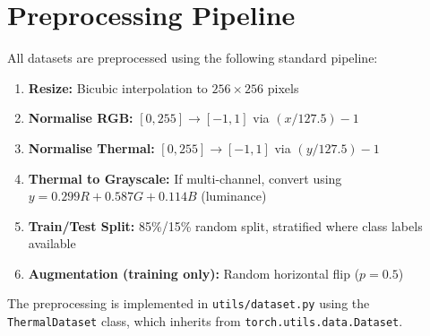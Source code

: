 \section{Preprocessing Pipeline}

All datasets are preprocessed using the following standard pipeline:

\begin{enumerate}
    \item \textbf{Resize:} Bicubic interpolation to $256 \times 256$ pixels
    \item \textbf{Normalise RGB:} $[0, 255] \to [-1, 1]$ via $(x/127.5) - 1$
    \item \textbf{Normalise Thermal:} $[0, 255] \to [-1, 1]$ via $(y/127.5) - 1$
    \item \textbf{Thermal to Grayscale:} If multi-channel, convert using $y = 0.299R + 0.587G + 0.114B$ (luminance)
    \item \textbf{Train/Test Split:} 85\%/15\% random split, stratified where class labels available
    \item \textbf{Augmentation (training only):} Random horizontal flip ($p=0.5$)
\end{enumerate}

The preprocessing is implemented in \texttt{utils/dataset.py} using the \texttt{ThermalDataset} class, which inherits from \texttt{torch.utils.data.Dataset}.
